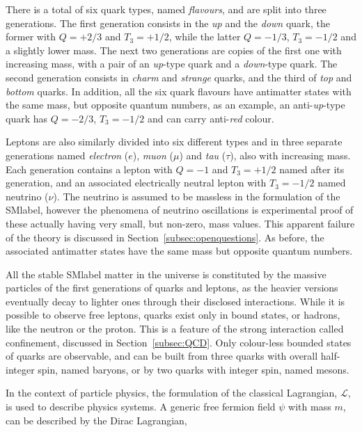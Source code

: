There is a total of six quark types, named \textit{flavours}, and are split into three generations.
The first generation consists in the \textit{up} and the \textit{down} quark, the former with $Q=+2/3$ and $T_3=+1/2$,
while the latter $Q=-1/3$, $T_3=-1/2$ and a slightly lower mass.
The next two generations are copies of the first one with increasing mass, with a pair of an
\textit{up}-type quark and a \textit{down}-type quark.
The second generation consists in \textit{charm} and \textit{strange} quarks, and the third of \textit{top} and \textit{bottom} quarks.
In addition, all the six quark flavours have antimatter states with the same mass, but opposite quantum numbers, as an example,
an anti-\textit{up}-type quark has $Q=-2/3$, $T_3=-1/2$ and can carry anti-\textit{red} colour.

Leptons are also similarly divided into six different types and in three separate generations named \textit{electron} ($e$), \textit{muon} ($\mu$) and \textit{tau} ($\tau$), also with increasing mass.
Each generation contains a lepton with $Q=-1$ and $T_3=+1/2$ named after its generation,
and an associated electrically neutral lepton with $T_3=-1/2$ named neutrino ($\nu$).
The neutrino is assumed to be massless in the formulation of the \acrshort{SMlabel},
however the phenomena of neutrino oscillations is experimental proof of these actually having very small, but non-zero, mass values.
This apparent failure of the theory is discussed in Section~\ref{subsec:openquestions}. As before, the associated antimatter states have the same mass but opposite quantum numbers.

All the stable \acrshort{SMlabel} matter in the universe is constituted by the massive particles of the first generations of quarks and leptons, as the heavier versions eventually decay to lighter ones through their disclosed interactions. While it is possible to observe free leptons, quarks exist only in bound states, or hadrons, like the neutron or the proton. This is a feature of the strong interaction called confinement, discussed in Section~\ref{subsec:QCD}. Only colour-less bounded states of quarks are observable, and can be built from three quarks with overall half-integer spin, named baryons, or by two quarks with integer spin, named mesons.

In the context of particle physics, the formulation of the classical Lagrangian, $\mathcal{L}$, is used to describe physics systems.
A generic free fermion field $\psi$ with mass $m$, can be described by the Dirac Lagrangian, 

